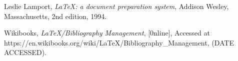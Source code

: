 \documentclass[a4paper,11pt]{article}
\theoremstyle{definition}
\begin{document}
\begin{thebibliography}{99}

	  Leslie Lamport,
	  \textit{\LaTeX: a document preparation system},
	  Addison Wesley, Massachusetts,
	  2nd edition,
	  1994.
	  
		Wikibooks,
		\textit{LaTeX/Bibliography Management},
		[0nline],
		Accessed at https://en.wikibooks.org/wiki/LaTeX/Bibliography\_Management,
		(DATE ACCESSED).
		
	
	\end{thebibliography}
\end{document}
